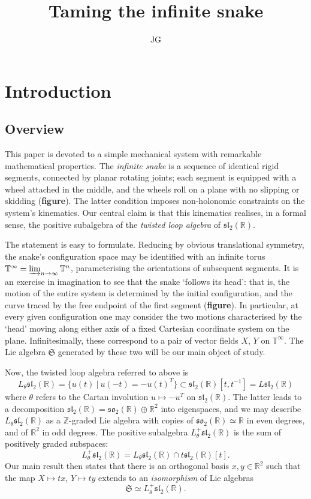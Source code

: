 \documentclass{article}
\title{Taming the infinite snake}
\author{JG}
\def\fsl{\mathfrak{sl}}
\def\fso{\mathfrak{so}}
\def\fS{\mathfrak{S}}
\def\ZZ{\mathbb{Z}}
\def\RR{\mathbb{R}}
\def\TT{\mathbb{T}}
\theoremstyle{definition}
\begin{document}
\sloppy\maketitle
\section{Introduction}
\label{sec:intro}
\subsection{Overview}
This paper is devoted to a simple mechanical
system with remarkable mathematical properties.
The \emph{infinite snake} is a sequence of 
identical rigid segments, connected by
planar rotating joints; each segment is
equipped with a wheel attached in the middle,
and the wheels roll 
on a plane with no slipping
or skidding (\textbf{figure}). The latter condition 
imposes non-holonomic constraints on the system's kinematics.
Our central claim is that
this kinematics realises, in a formal sense, the positive
subalgebra of the 
\emph{twisted loop algebra} of $\fsl_2(\RR)$. 

The statement is easy to formulate. Reducing by obvious translational
symmetry, the snake's configuration space may be identified with an
infinite torus $\TT^\infty = \varinjlim_{n\to\infty} \TT^n$, parameterising
the orientations of subsequent segments.
It is an exercise in imagination to see that the snake `follows its head':
that is, the motion of the entire system is determined by the initial configuration,
and the curve traced by the free endpoint of the first segment (\textbf{figure}). 
In particular, at every given configuration one may consider the two motions characterised
by the `head' moving along either axis of a fixed Cartesian coordinate system on the plane.
Infinitesimally, these correspond to a pair of vector fields $X$, $Y$ on $\TT^\infty$.
The Lie algebra $\fS$ generated by these two will be our main object of study.

Now, the twisted loop algebra referred to above is
$$
L_\theta\fsl_2(\RR) = \{ u(t)\ |\ u(-t)=-u(t)^T \} \subset \fsl_2(\RR)[t,t^{-1}] = L\fsl_2(\RR)
$$
where $\theta$ refers to the Cartan involution $u \mapsto -u^T$ on $\fsl_2(\RR)$.
The latter leads to a decomposition $\fsl_2(\RR) = \fso_2(\RR) \oplus \RR^2$ into eigenspaces,
and we may describe $L_\theta\fsl_2(\RR)$ as a $\ZZ$-graded Lie algebra with copies of 
$\fso_2(\RR)\simeq\RR$ in even degrees, and of $\RR^2$ in odd degrees.
The positive subalgebra $L_\theta^+\fsl_2(\RR)$ is the sum of positively graded subspaces:
$$
L_\theta^+\fsl_2(\RR) = L_\theta\fsl_2(\RR) \cap t \fsl_2(\RR)[t].
$$
Our main result then states that there is an orthogonal
basis $x,y\in\RR^2$ such that the map $X\mapsto tx$, $Y\mapsto ty$
extends to an \emph{isomorphism} of Lie algebras
$$\fS \simeq L_\theta^+\fsl_2(\RR). $$
\end{document}

